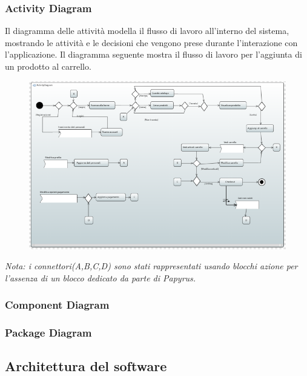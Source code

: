 \documentclass[a4paper,12pt]{article}
\begin{document}
\subsubsection{Activity Diagram}
Il diagramma delle attività modella il flusso di lavoro all'interno del sistema, mostrando le attività e le decisioni che vengono prese durante l'interazione con l'applicazione.   
Il diagramma seguente mostra il flusso di lavoro per l'aggiunta di un prodotto al carrello.
\begin{figure}[H]
    \centering
    \includegraphics[width=1\textwidth]{../UML/UML png/ActivityDiagram.png}
    \label{fig:Activity Diagram}
\end{figure}
\textit{Nota: i connettori(A,B,C,D) sono stati rappresentati usando blocchi azione per l'assenza di un blocco dedicato da parte di Papyrus.}
\subsubsection{Component Diagram}
\subsubsection{Package Diagram}

\subsection{Architettura del software}
\end{document}
